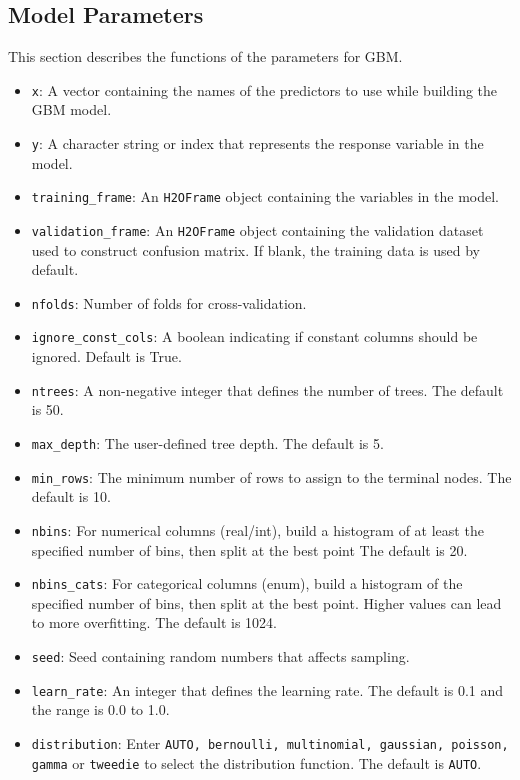 \waterExampleInR
 


\subsection{ Model Parameters}
\label{ssec:Model Parameters}

This section describes the functions of the parameters for GBM. 
\begin{itemize}
\item {\texttt{x}}: A vector containing the names of the predictors to use while building the GBM model. 
\item {\texttt{y}}: A character string or index that represents the response variable in the model.  
\item {\texttt{training\_frame}}: An \texttt{H2OFrame} object containing the variables in the model. 
\item {\texttt{validation\_frame}}: An \texttt{H2OFrame} object containing the validation dataset used to construct confusion matrix. If  blank, the training data is used by default.
\item {\texttt{nfolds}}: Number of folds for cross-validation. 
\item {\texttt{ignore\_const\_cols}}: A boolean indicating if constant columns should be ignored.  Default is True.
\item {\texttt{ntrees}}: A non-negative integer that defines the number of trees. The default is 50.
\item {\texttt{max\_depth}}: The user-defined tree depth. The default is 5.
\item {\texttt{min\_rows}}: The minimum number of rows to assign to the terminal nodes. The default is 10.
\item {\texttt{nbins}}: For numerical columns (real/int), build a histogram of at least the specified number of bins, then split at the best point The default is 20.
\item {\texttt{nbins\_cats}}: For categorical columns (enum), build a histogram of the specified number of bins, then split at the best point. Higher values can lead to more overfitting.  The default is 1024.
\item {\texttt{seed}}: Seed containing random numbers that affects sampling.
\item {\texttt{learn\_rate}}: An integer that defines the learning rate. The default is 0.1 and the range is 0.0 to 1.0.
\item {\texttt{distribution}}: Enter {\texttt{AUTO, bernoulli, multinomial, gaussian, poisson, gamma}} or {\texttt{tweedie}} to select the distribution function. The default is {\texttt{AUTO}}.

\end{itemize}
